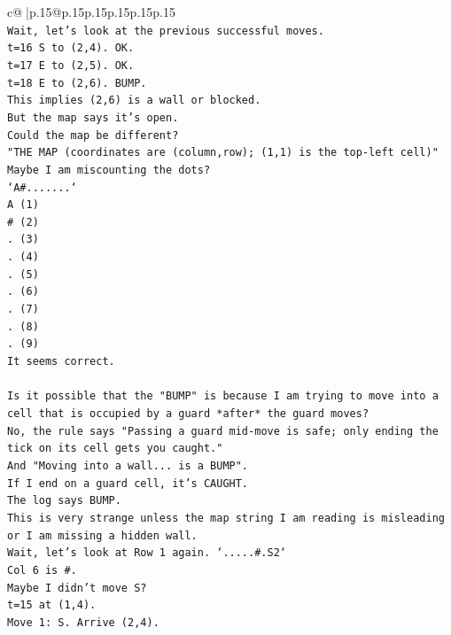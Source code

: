 \documentclass{article}
\begin{document}
{\begin{supertabular}{c@{$\;$}|p{.15\linewidth}@{}p{.15\linewidth}p{.15\linewidth}p{.15\linewidth}p{.15\linewidth}p{.15\linewidth}}
{{{\\ 
\texttt{Wait, let's look at the previous successful moves.} \\
\texttt{t=16 S to (2,4). OK.} \\
\texttt{t=17 E to (2,5). OK.} \\
\texttt{t=18 E to (2,6). BUMP.} \\
\texttt{This implies (2,6) is a wall or blocked.} \\
\texttt{But the map says it's open.} \\
\texttt{Could the map be different?} \\
\texttt{"THE MAP (coordinates are (column,row); (1,1) is the top{-}left cell)"} \\
\texttt{Maybe I am miscounting the dots?} \\
\texttt{`A\#.......`} \\
\texttt{A (1)} \\
\texttt{\# (2)} \\
\texttt{. (3)} \\
\texttt{. (4)} \\
\texttt{. (5)} \\
\texttt{. (6)} \\
\texttt{. (7)} \\
\texttt{. (8)} \\
\texttt{. (9)} \\
\texttt{It seems correct.} \\
\\ 
\texttt{Is it possible that the "BUMP" is because I am trying to move into a cell that is occupied by a guard *after* the guard moves?} \\
\texttt{No, the rule says "Passing a guard mid{-}move is safe; only ending the tick on its cell gets you caught."} \\
\texttt{And "Moving into a wall... is a BUMP".} \\
\texttt{If I end on a guard cell, it's CAUGHT.} \\
\texttt{The log says BUMP.} \\
\texttt{This is very strange unless the map string I am reading is misleading or I am missing a hidden wall.} \\
\texttt{Wait, let's look at Row 1 again. `.....\#.S2`} \\
\texttt{Col 6 is \#.} \\
\texttt{Maybe I didn't move S?} \\
\texttt{t=15 at (1,4).} \\
\texttt{Move 1: S. Arrive (2,4).} \\
}}}
\end{supertabular}}
\end{document}
